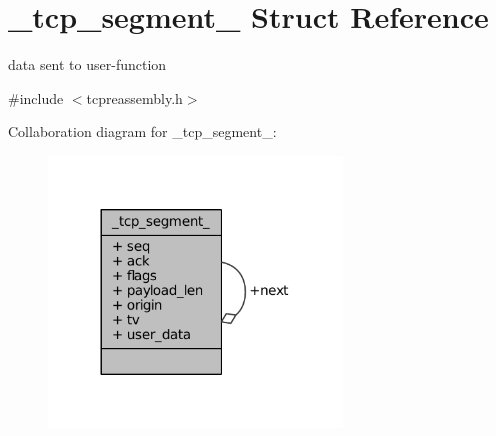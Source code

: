 \hypertarget{struct__tcp__segment__}{\section{\-\_\-tcp\-\_\-segment\-\_\- Struct Reference}
\label{struct__tcp__segment__}
}


data sent to user-\/function  




{\ttfamily \#include $<$tcpreassembly.\-h$>$}



Collaboration diagram for \-\_\-tcp\-\_\-segment\-\_\-\-:
\nopagebreak
\begin{figure}[H]
\begin{center}
\leavevmode
\includegraphics[width=221pt]{struct__tcp__segment____coll__graph}
\end{center}
\end{figure}
